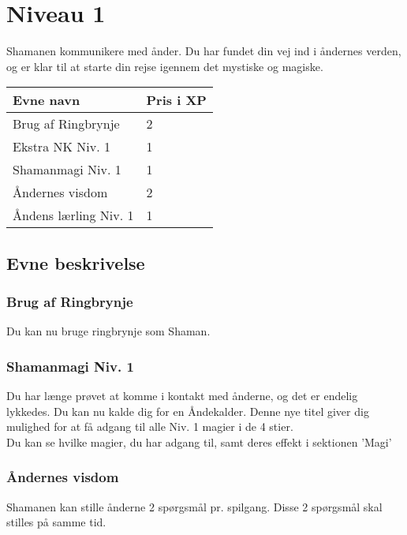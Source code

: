 \chapter*{Niveau 1}
Shamanen kommunikere med ånder. Du har fundet din vej ind i åndernes verden, og er klar til at starte din rejse igennem det mystiske og magiske.

\begin{table}[H]
    \centering
    \begin{tabular}{|p{}|p{}|}
    \rowcolor{cerulean!80}\hline
        Evne navn & Pris i XP \\\hline
        Brug af Ringbrynje & 2\\\hline
         Ekstra NK Niv. 1 & 1\\\hline
         Shamanmagi Niv. 1 & 1\\\hline
         Åndernes visdom & 2\\\hline
         Åndens lærling Niv. 1 & 1\\\hline
    \end{tabular}
\end{table}

\section*{Evne beskrivelse}

\subsection*{Brug af Ringbrynje}
Du kan nu bruge ringbrynje som Shaman. 



\subsection*{Shamanmagi Niv. 1}
Du har længe prøvet at komme i kontakt med ånderne, og det er endelig lykkedes. Du kan nu kalde dig for en Åndekalder. Denne nye titel giver dig mulighed for at få adgang til alle Niv. 1 magier i de 4 stier.\\
Du kan se hvilke magier, du har adgang til, samt deres effekt i sektionen 'Magi'\\

\subsection*{Åndernes visdom}
Shamanen kan stille ånderne 2 spørgsmål pr. spilgang. Disse 2 spørgsmål skal stilles på samme tid. 

